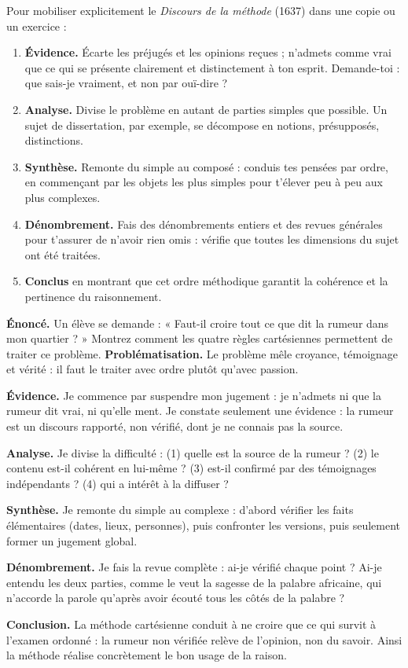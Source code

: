 \documentclass[11pt]{article}
\begin{document}
\begin{methode}
Pour mobiliser explicitement le \emph{Discours de la méthode} (1637) dans une copie ou un exercice :
\begin{enumerate}
\item \textbf{Évidence.} Écarte les préjugés et les opinions reçues ; n'admets comme vrai que ce qui se présente clairement et distinctement à ton esprit. Demande-toi : que sais-je vraiment, et non par ouï-dire ?
\item \textbf{Analyse.} Divise le problème en autant de parties simples que possible. Un sujet de dissertation, par exemple, se décompose en notions, présupposés, distinctions.
\item \textbf{Synthèse.} Remonte du simple au composé : conduis tes pensées par ordre, en commençant par les objets les plus simples pour t'élever peu à peu aux plus complexes.
\item \textbf{Dénombrement.} Fais des dénombrements entiers et des revues générales pour t'assurer de n'avoir rien omis : vérifie que toutes les dimensions du sujet ont été traitées.
\item \textbf{Conclus} en montrant que cet ordre méthodique garantit la cohérence et la pertinence du raisonnement.
\end{enumerate}
\end{methode}

\begin{exoresolu}
\textbf{Énoncé.} Un élève se demande : « Faut-il croire tout ce que dit la rumeur dans mon quartier ? » Montrez comment les quatre règles cartésiennes permettent de traiter ce problème.
\tcblower
\textbf{Problématisation.} Le problème mêle croyance, témoignage et vérité : il faut le traiter avec ordre plutôt qu'avec passion.

\textbf{Évidence.} Je commence par suspendre mon jugement : je n'admets ni que la rumeur dit vrai, ni qu'elle ment. Je constate seulement une évidence : la rumeur est un discours rapporté, non vérifié, dont je ne connais pas la source.

\textbf{Analyse.} Je divise la difficulté : (1) quelle est la source de la rumeur ? (2) le contenu est-il cohérent en lui-même ? (3) est-il confirmé par des témoignages indépendants ? (4) qui a intérêt à la diffuser ?

\textbf{Synthèse.} Je remonte du simple au complexe : d'abord vérifier les faits élémentaires (dates, lieux, personnes), puis confronter les versions, puis seulement former un jugement global.

\textbf{Dénombrement.} Je fais la revue complète : ai-je vérifié chaque point ? Ai-je entendu les deux parties, comme le veut la sagesse de la palabre africaine, qui n'accorde la parole qu'après avoir écouté tous les côtés de la palabre ?

\textbf{Conclusion.} La méthode cartésienne conduit à ne croire que ce qui survit à l'examen ordonné : la rumeur non vérifiée relève de l'opinion, non du savoir. Ainsi la méthode réalise concrètement le bon usage de la raison.
\end{exoresolu}
\end{document}

